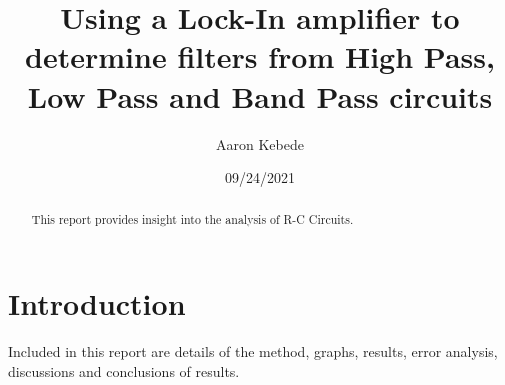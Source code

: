 \documentclass[a4paper]{article}\usepackage[english]{babel}
\title{Using a Lock-In amplifier to determine filters from High Pass, Low Pass and Band Pass circuits }
\author{Aaron Kebede}
\date{09/24/2021}
\begin{document}
\maketitle
\begin{abstract}
This report provides insight into the analysis of R-C Circuits. 
\end{abstract}

\section{Introduction}

Included in this report are details of the method, graphs, results, error analysis, discussions and conclusions of results.
\end{document}
